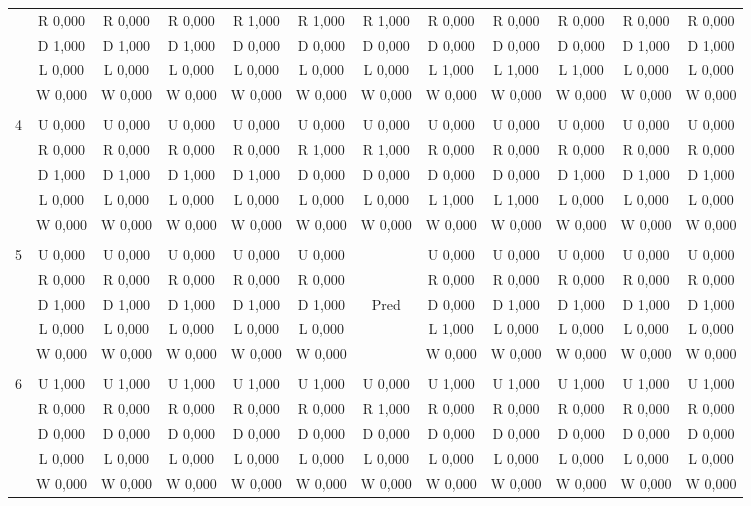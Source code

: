 \begin{table}[htbp]
\begin{footnotesize}
\begin{tabular}{c|c|c|c|c|c|c|c|c|c|c|c|}
&R 0,000&R 0,000&R 0,000&R 1,000&R 1,000&R 1,000&R 0,000&R 0,000&R 0,000&R 0,000&R 0,000\\
&D 1,000&D 1,000&D 1,000&D 0,000&D 0,000&D 0,000&D 0,000&D 0,000&D 0,000&D 1,000&D 1,000\\
&L 0,000&L 0,000&L 0,000&L 0,000&L 0,000&L 0,000&L 1,000&L 1,000&L 1,000&L 0,000&L 0,000\\
&W 0,000&W 0,000&W 0,000&W 0,000&W 0,000&W 0,000&W 0,000&W 0,000&W 0,000&W 0,000&W 0,000\\
\hline \\
4&U 0,000&U 0,000&U 0,000&U 0,000&U 0,000&U 0,000&U 0,000&U 0,000&U 0,000&U 0,000&U 0,000\\
&R 0,000&R 0,000&R 0,000&R 0,000&R 1,000&R 1,000&R 0,000&R 0,000&R 0,000&R 0,000&R 0,000\\
&D 1,000&D 1,000&D 1,000&D 1,000&D 0,000&D 0,000&D 0,000&D 0,000&D 1,000&D 1,000&D 1,000\\
&L 0,000&L 0,000&L 0,000&L 0,000&L 0,000&L 0,000&L 1,000&L 1,000&L 0,000&L 0,000&L 0,000\\
&W 0,000&W 0,000&W 0,000&W 0,000&W 0,000&W 0,000&W 0,000&W 0,000&W 0,000&W 0,000&W 0,000\\
\hline \\
5&U 0,000&U 0,000&U 0,000&U 0,000&U 0,000&&U 0,000&U 0,000&U 0,000&U 0,000&U 0,000\\
&R 0,000&R 0,000&R 0,000&R 0,000&R 0,000&&R 0,000&R 0,000&R 0,000&R 0,000&R 0,000\\
&D 1,000&D 1,000&D 1,000&D 1,000&D 1,000&Pred&D 0,000&D 1,000&D 1,000&D 1,000&D 1,000\\
&L 0,000&L 0,000&L 0,000&L 0,000&L 0,000&&L 1,000&L 0,000&L 0,000&L 0,000&L 0,000\\
&W 0,000&W 0,000&W 0,000&W 0,000&W 0,000&&W 0,000&W 0,000&W 0,000&W 0,000&W 0,000\\
\hline \\
6&U 1,000&U 1,000&U 1,000&U 1,000&U 1,000&U 0,000&U 1,000&U 1,000&U 1,000&U 1,000&U 1,000\\
&R 0,000&R 0,000&R 0,000&R 0,000&R 0,000&R 1,000&R 0,000&R 0,000&R 0,000&R 0,000&R 0,000\\
&D 0,000&D 0,000&D 0,000&D 0,000&D 0,000&D 0,000&D 0,000&D 0,000&D 0,000&D 0,000&D 0,000\\
&L 0,000&L 0,000&L 0,000&L 0,000&L 0,000&L 0,000&L 0,000&L 0,000&L 0,000&L 0,000&L 0,000\\
&W 0,000&W 0,000&W 0,000&W 0,000&W 0,000&W 0,000&W 0,000&W 0,000&W 0,000&W 0,000&W 0,000\\

\end{tabular}
\end{footnotesize}
\end{table}

